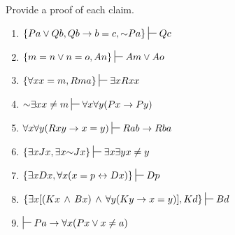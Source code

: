 \practiceproblems


\problempart
\label{pr.identity}
Provide a proof of each claim.
\begin{enumerate}[label=\arabic*), topsep=0pt, parsep=0pt, itemsep=3pt] 
\item $\{Pa \eor Qb, Qb \eif b=c, \enot Pa\}\sststile{}{} Qc$
\item $\{m=n \eor n=o, An\}\sststile{}{} Am \eor Ao$
\item $\{\forall x x=m, Rma\}\sststile{}{} \exists x Rxx$
\item $\enot \exists x x \neq m \sststile{}{} \forall x\forall y (Px \eif Py)$
\item $\forall x\forall y(Rxy \eif x=y)\sststile{}{} Rab \eif Rba$
\item $\{\exists x Jx, \exists x \enot Jx\}\sststile{}{} \exists x \exists y x\neq y$
\item $\{\exists x Dx, \forall x(x=p \eiff Dx)\}\sststile{}{} Dp$
\item $\{\exists x [(Kx \eand Bx) \eand \forall y(Ky \eif x=y)], Kd\}\sststile{}{} Bd$
\item $\sststile{}{} Pa \eif \forall x(Px \eor x \neq a)$
\end{enumerate}









